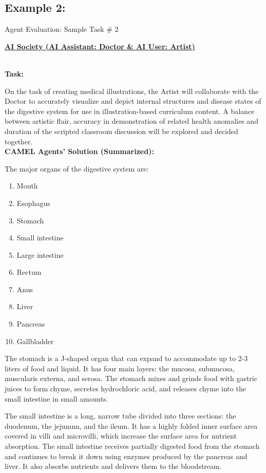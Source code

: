\pagebreak
\subsection{Example 2:}

\begin{AIBoxBreak}{Agent Evaluation: Sample Task \# 2}
	\parbox[t]{\textwidth}{{\bf \underline{AI Society (AI Assistant: Doctor \& AI User: Artist)}}}\\

	\textbf{Task:}

	On the task of creating medical illustrations, the Artist will collaborate with the Doctor to accurately visualize and depict internal structures and disease states of the digestive system for use in illustration-based curriculum content. A balance between artistic flair, accuracy in demonstration of related health anomalies and duration of the scripted classroom discussion will be explored and decided together.\\

	\textbf{CAMEL Agents' Solution (Summarized):}

	The major organs of the digestive system are:

	\begin{enumerate}
		\item Mouth
		\item Esophagus
		\item Stomach
		\item Small intestine
		\item Large intestine
		\item Rectum
		\item Anus
		\item Liver
		\item Pancreas
		\item Gallbladder
	\end{enumerate}

	The stomach is a J-shaped organ that can expand to accommodate up to 2-3 liters of food and liquid. It has four main layers: the mucosa, submucosa, muscularis externa, and serosa. The stomach mixes and grinds food with gastric juices to form chyme, secretes hydrochloric acid, and releases chyme into the small intestine in small amounts.

	The small intestine is a long, narrow tube divided into three sections: the duodenum, the jejunum, and the ileum. It has a highly folded inner surface area covered in villi and microvilli, which increase the surface area for nutrient absorption. The small intestine receives partially digested food from the stomach and continues to break it down using enzymes produced by the pancreas and liver. It also absorbs nutrients and delivers them to the bloodstream.


\end{AIBoxBreak}
